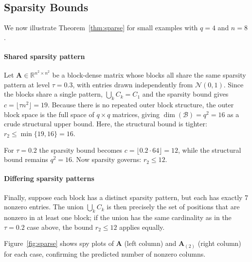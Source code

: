 \documentclass{siamart251216}
\newcommand{\RR}[2]{\mathbb{R}^{#1 \times #2}}
\newcommand{\munfold}[2]{\mathbf{#1}_{(#2)}}
\def\bA{\mathbf{A}}
\begin{document}
\subsection{Sparsity Bounds}
\label{sec:sparse_ex}

We now illustrate Theorem~\ref{thm:sparse} for small examples with $q=4$ and $n=8$.

\paragraph{Shared sparsity pattern}
Let $\bA\in\RR{n^2}{n^2}$ be a block-dense matrix whose blocks all share the same sparsity
pattern at level $\tau=0.3$, with entries drawn independently from $\mathcal{N}(0,1)$.  Since
the blocks share a single pattern, $\bigcup_k C_k = C_1$ and the sparsity bound gives
$c = \lfloor\tau n^2\rfloor = 19$.  Because there is no repeated outer block structure, the outer
block space is the full space of $q\times q$ matrices, giving $\dim(\mathscr{B}) = q^2 = 16$ as
a crude structural upper bound.  Here, the structural bound is tighter: $r_2 \le \min\{19,16\}=16$.

For $\tau = 0.2$ the sparsity bound becomes $c = \lfloor 0.2\cdot 64\rfloor = 12$, while the
structural bound remains $q^2=16$.  Now sparsity governs: $r_2\le 12$.

\paragraph{Differing sparsity patterns}
Finally, suppose each block has a distinct sparsity pattern, but each has exactly 7 nonzero
entries.  The union $\bigcup_k C_k$ is then precisely the set of positions that are nonzero in
at least one block; if the union has the same cardinality as in the $\tau=0.2$ case above, the
bound $r_2\le 12$ applies equally.

Figure~\ref{fig:sparse} shows spy plots of $\bA$ (left column) and $\munfold{A}{2}$ (right
column) for each case, confirming the predicted number of nonzero columns.
\end{document}
